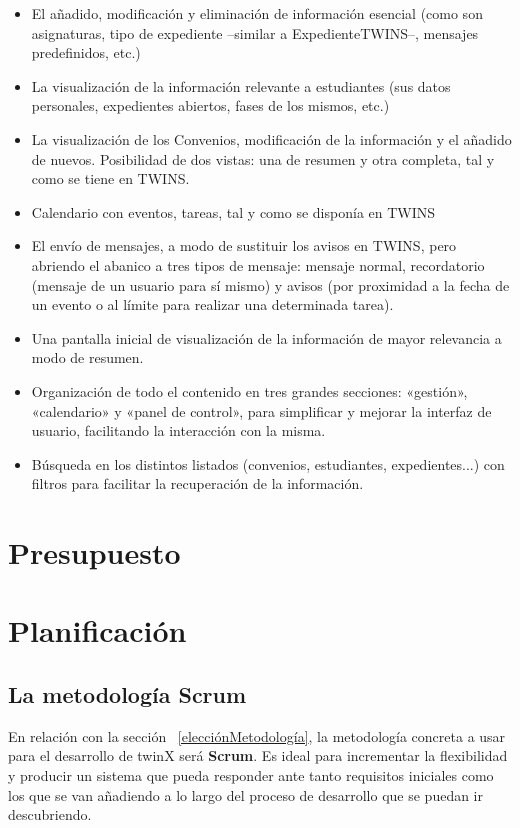 \begin{itemize}
	\item El añadido, modificación y eliminación de información esencial (como son asignaturas, tipo de expediente --similar a \gls{ExpedienteTWINS}--, mensajes predefinidos, etc.)
	\item La visualización de la información relevante a estudiantes (sus datos personales, expedientes abiertos, fases de los mismos, etc.)
	\item La visualización de los \glspl{Convenio}, modificación de la información y el añadido de nuevos. Posibilidad de dos vistas: una de resumen y otra completa, tal y como se tiene en TWINS.
	\item Calendario con eventos, tareas, tal y como se disponía en TWINS
	\item El envío de mensajes, a modo de sustituir los avisos en TWINS, pero abriendo el abanico a tres tipos de mensaje: mensaje normal, recordatorio (mensaje de un usuario para sí mismo) y avisos (por proximidad a la fecha de un evento o al límite para realizar una determinada tarea).
	\item Una pantalla inicial de visualización de la información de mayor relevancia a modo de resumen. 
	\item Organización de todo el contenido en tres grandes secciones: «gestión», «calendario» y «panel de control», para simplificar y mejorar la interfaz de usuario, facilitando la interacción con la misma.
	\item Búsqueda en los distintos listados (convenios, estudiantes, expedientes...) con filtros para facilitar la recuperación de la información.
\end{itemize}

\section{Presupuesto}

\section{Planificación}
\subsection{La metodología Scrum}
En relación con la sección ~\ref{elecciónMetodología}, la metodología concreta a usar para el desarrollo de twinX será \textbf{Scrum}. Es ideal para incrementar la flexibilidad y producir un sistema que pueda responder ante tanto requisitos iniciales como los que se van añadiendo a lo largo del proceso de desarrollo que se puedan ir descubriendo.

